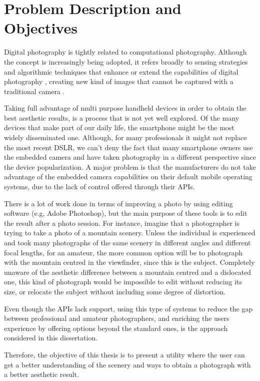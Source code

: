 \section{Problem Description and Objectives}
\label{sec:problem_description}
Digital photography is tightly related to computational photography. Although the concept is increasingly being adopted, it refers broadly to sensing strategies and algorithmic techniques that enhance or extend the capabilities of digital photography \cite{szeliski2012technical} , creating new kind of images that cannot be captured with a traditional camera \cite{pulli2009mobile}. 

Taking full advantage of multi purpose handheld devices in order to obtain the best aesthetic results, is a process that is not yet well explored. 
Of the many devices that make part of our daily life, the smartphone might be the most widely disseminated one. Although, for many professionals it might not replace the most recent DSLR, we can't deny the fact that many smartphone owners use the embedded camera and have taken photography in a different perspective since the device popularization. A major problem is that the manufacturers do not take advantage of the embedded camera capabilities on their default mobile operating systems, due to the lack of control offered through their APIs.

There is a lot of work done in terms of improving a photo by using editing software (e.g, Adobe Photoshop), but the main purpose of these tools is to edit the result after a photo session. For instance, imagine that a photographer is trying to take a photo of a mountain scenery. Unless the individual is experienced and took many photographs of the same scenery in different angles and different focal lengths, for an amateur, the more common option will be to photograph with the mountain centred in the viewfinder, since this is the subject. Completely unaware of the aesthetic difference between a mountain centred and a dislocated one, this kind of photograph would be impossible to edit without reducing its size, or relocate the subject without including some degree of distortion.

Even though the APIs lack  support, using this type of systems to reduce the gap between professional and amateur photographers, and enriching the users experience by offering options beyond the standard ones, is the approach considered in this dissertation.

Therefore, the objective of this thesis is to present a utility where the user can get a better understanding of the scenery and ways to obtain a photograph with a better aesthetic result.

